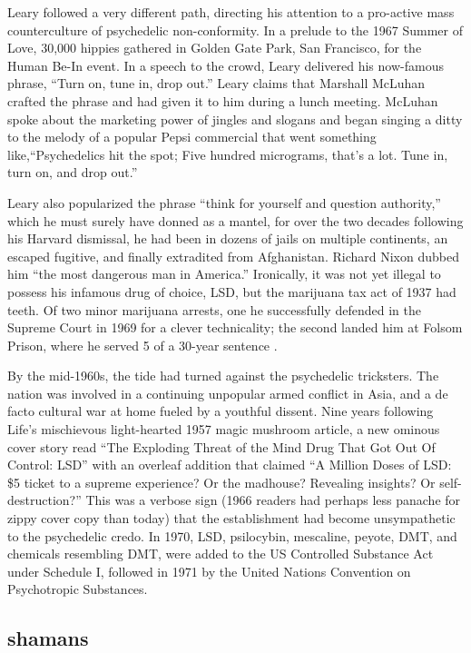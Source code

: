 \documentclass{UIdahoMastersThesis}
\begin{document}
Leary followed a very different path, directing his attention to a pro-active mass counterculture of psychedelic non-conformity. In a prelude to the 1967 Summer of Love, 30,000 hippies gathered in Golden Gate Park, San Francisco, for the Human Be-In event. In a speech to the crowd, Leary delivered his now-famous phrase, ``Turn on, tune in, drop out.'' Leary claims that Marshall McLuhan crafted the phrase and had given it to him during a lunch meeting. McLuhan spoke about the marketing power of jingles and slogans and began singing a ditty to the melody of a popular Pepsi commercial that went something like,\enquote{Psychedelics hit the spot; Five hundred micrograms, that's a lot. Tune in, turn on, and drop out.}

Leary also popularized the phrase ``think for yourself and question authority,'' which he must surely have donned as a mantel, for over the two decades following his Harvard dismissal, he had been in dozens of jails on multiple continents, an escaped fugitive, and finally extradited from Afghanistan. Richard Nixon dubbed him ``the most dangerous man in America.'' Ironically, it was not yet illegal to possess his infamous drug of choice, LSD, but the marijuana tax act of 1937 had teeth. Of two minor marijuana arrests, one he successfully defended in the Supreme Court in 1969 for a clever technicality; the second landed him at Folsom Prison, where he served 5 of a 30-year sentence \cite{higgs_i_2006}.

By the mid-1960s, the tide had turned against the psychedelic tricksters. The nation was involved in a continuing unpopular armed conflict in Asia, and a de facto cultural war at home fueled by a youthful dissent. Nine years following Life's mischievous light-hearted 1957 magic mushroom article, a new ominous cover story read \enquote{The Exploding Threat of the Mind Drug That Got Out Of Control: LSD} with an overleaf addition that claimed \enquote{A Million Doses of LSD: \$5 ticket to a supreme experience? Or the madhouse? Revealing insights? Or self-destruction?} This was a verbose sign (1966 readers had perhaps less panache for zippy cover copy than today) that the establishment had become unsympathetic to the psychedelic credo. In 1970, LSD, psilocybin, mescaline, peyote, DMT, and chemicals resembling DMT, were added to the US Controlled Substance Act under Schedule I, followed in 1971 by the United Nations Convention on Psychotropic Substances. 



\subsection{shamans}
\end{document}

